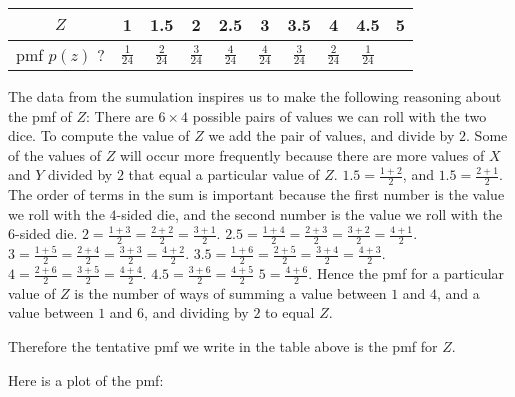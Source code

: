 \documentclass[a4paper,11pt]{article}
\begin{document}
\begin{center}
  \begin{tabular}{ | c | c | c | c | c | c | c | c | c | c |}
    \hline
	$Z$ & 1 & 1.5 & 2 & 2.5 & 3 & 3.5 & 4 & 4.5 & 5  \\ \hline
  pmf $p\left( z \right)$ ? & $\frac{1}{24}$ & $\frac{2}{24}$ & $\frac{3}{24}$ &
		$\frac{4}{24}$ & $\frac{4}{24}$ & $\frac{3}{24}$ & $\frac{2}{24}$ &
		$\frac{1}{24}$ \\ \hline
  \end{tabular}

The data from the sumulation inspires us to make the following reasoning about
the pmf of $Z$:  There are $6 \times 4$ possible pairs of values we can roll
with the two dice.  To compute the value of $Z$ we add the pair of values, and
divide by $2$.  Some of the values of $Z$ will occur more frequently because
there are more values of $X$ and $Y$ divided by $2$ that equal a particular
value of $Z$.  $1.5=\frac{1+2}{2}$, and $1.5=\frac{2+1}{2}$.  The order of
terms in the sum is important because the first number is the value we roll
with the $4$-sided die, and the second number is the value we roll with the
$6$-sided die.  $2=\frac{1+3}{2}=\frac{2+2}{2}=\frac{3+1}{2}$.
$2.5=\frac{1+4}{2}=\frac{2+3}{2}=\frac{3+2}{2}=\frac{4+1}{2}$.
$3=\frac{1+5}{2}=\frac{2+4}{2}=\frac{3+3}{2}=\frac{4+2}{2}$.
$3.5=\frac{1+6}{2}=\frac{2+5}{2}=\frac{3+4}{2}=\frac{4+3}{2}$.
$4=\frac{2+6}{2}=\frac{3+5}{2}=\frac{4+4}{2}$.
$4.5=\frac{3+6}{2}=\frac{4+5}{2}$
$5=\frac{4+6}{2}$.  Hence the pmf for a particular value of $Z$ is the number
of ways of summing a value between $1$ and $4$, and a value between $1$ and
$6$, and dividing by $2$ to equal $Z$.

Therefore the tentative pmf we write in the table above is the pmf for $Z$.

Here is a plot of the pmf:

\end{center}
\printbibliography{}
\end{document}
